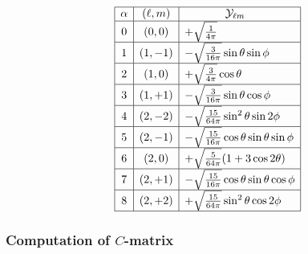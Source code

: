 \documentclass[letterpaper]{article}
\newcommand{\YY}{\mc Y}
\begin{document}
$$\begin{array}{|c|c|l|}\hline
\alpha & (\ell, m) & \hspace{0.5in} \YY_{\ell m}          \\\hline
0      & (   0, 0) & +\sqrt\frac{1}{4\pi} \\\hline
1      & (   1,-1) & -\sqrt{\frac{3}{16\pi}} \sin\theta\sin\phi  \\\hline
2      & (   1, 0) & +\sqrt\frac{3}{4\pi} \cos\theta          \\\hline
3      & (   1,+1) & -\sqrt{\frac{3}{16\pi}} \sin\theta\cos\phi  \\\hline
4      & (   2,-2) & -\sqrt\frac{15}{64\pi} \sin^2\theta \sin 2\phi \\ \hline
5      & (   2,-1) & -\sqrt\frac{15}{16\pi} \cos\theta \sin\theta \sin\phi \\ \hline
6      & (   2, 0) & +\sqrt\frac{5}{64\pi}(1+3\cos 2\theta) \\ \hline
7      & (   2,+1) & -\sqrt\frac{15}{16\pi} \cos\theta \sin\theta \cos\phi \\ \hline
8      & (   2,+2) & +\sqrt\frac{15}{64\pi} \sin^2\theta \cos 2\phi \\ \hline
\end{array}$$
\renewcommand{\arraystretch}{1.0}

\subsubsection*{Computation of $C$-matrix}
\end{document}
